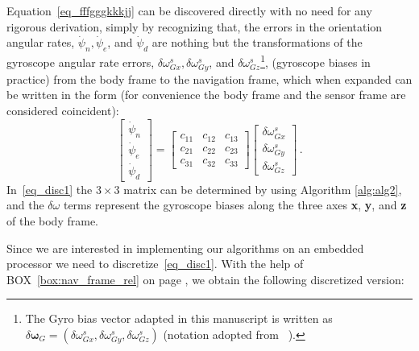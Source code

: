 \documentclass[journal]{IEEEtran}
\begin{document}
Equation~\eqref{eq_fffgggkkkjj} can be discovered directly with no need for any rigorous derivation, simply by recognizing that, the errors in the orientation angular rates, $\dot\psi_n, \dot\psi_e$, and $\dot\psi_d$ are nothing but the transformations of the  gyroscope  angular rate errors, $\delta\omega_{Gx}^s, \delta\omega_{Gy}^s$, and  $\delta\omega_{Gz}^s$\footnote{The Gyro bias vector adapted in this manuscript is written as $\delta\boldsymbol{\omega}_G = (\delta\omega_{Gx}^s,\delta\omega_{Gy}^s ,\delta\omega_{Gz}^s )$ (notation adopted  from ~\cite{petkov2010stochastic}). }, (gyroscope biases in practice) from the body frame to the navigation frame, which when expanded can be written in the form (for convenience the body frame and the sensor frame are considered coincident):
\begin{equation}\label{eq_disc1}
\begin{bmatrix}
 \dot{{\psi}}_n \\
  \dot{{\psi}}_e\\
   \dot{{\psi}}_d
\end{bmatrix}
=\begin{bmatrix}
    c_{11} & c_{12} & c_{13} \\
    c_{21} & c_{22} & c_{23} \\
    c_{31} & c_{32}& c_{33}
    \end{bmatrix}\begin{bmatrix}
    \delta\omega_{Gx}^s \\
    \delta\omega_{Gy}^s \\
    \delta\omega_{Gz}^s
    \end{bmatrix}\,.
\end{equation}
In~\eqref{eq_disc1} the $3\times3$ matrix can be determined by using Algorithm 
\ref{alg:alg2}, and the $\delta\omega$ terms represent the gyroscope biases along the three axes \textbf{x}, \textbf{y}, and \textbf{z} of the body frame.\par
Since we are interested in implementing our algorithms on an embedded processor we need to discretize~\eqref{eq_disc1}. With the help of BOX~\ref{box:nav_frame_rel} on page \pageref{box:nav_frame_rel}, we obtain the following discretized version:
\end{document}
